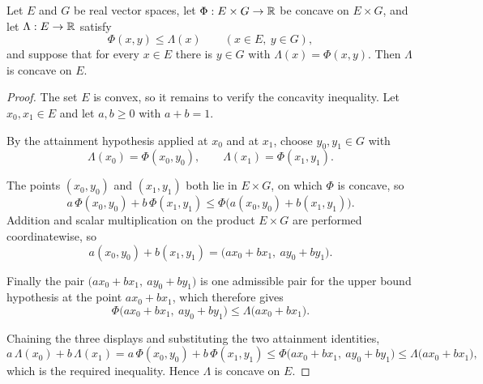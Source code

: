 \begin{lemma}
Let $E$ and $G$ be real vector spaces, let $\Phi:E\times G\to\mathbb{R}$ be concave on
$E\times G$, and let $\Lambda:E\to\mathbb{R}$ satisfy
\[
  \Phi(x,y)\le\Lambda(x)\qquad(x\in E,\ y\in G),
\]
and suppose that for every $x\in E$ there is $y\in G$ with $\Lambda(x)=\Phi(x,y)$. Then
$\Lambda$ is concave on $E$.
\end{lemma}
\begin{proof}
The set $E$ is convex, so it remains to verify the concavity inequality. Let $x_0,x_1\in E$
and let $a,b\ge0$ with $a+b=1$.

By the attainment hypothesis applied at $x_0$ and at $x_1$, choose $y_0,y_1\in G$ with
\[
  \Lambda(x_0)=\Phi(x_0,y_0),\qquad \Lambda(x_1)=\Phi(x_1,y_1).
\]

The points $(x_0,y_0)$ and $(x_1,y_1)$ both lie in $E\times G$, on which $\Phi$ is
concave, so
\[
  a\,\Phi(x_0,y_0)+b\,\Phi(x_1,y_1)
   \le\Phi\bigl(a(x_0,y_0)+b(x_1,y_1)\bigr).
\]
Addition and scalar multiplication on the product $E\times G$ are performed
coordinatewise, so
\[
  a(x_0,y_0)+b(x_1,y_1)=\bigl(ax_0+bx_1,\ ay_0+by_1\bigr).
\]

Finally the pair $\bigl(ax_0+bx_1,\ ay_0+by_1\bigr)$ is one admissible pair for the upper
bound hypothesis at the point $ax_0+bx_1$, which therefore gives
\[
  \Phi\bigl(ax_0+bx_1,\ ay_0+by_1\bigr)\le\Lambda\bigl(ax_0+bx_1\bigr).
\]

Chaining the three displays and substituting the two attainment identities,
\[
  a\,\Lambda(x_0)+b\,\Lambda(x_1)
   =a\,\Phi(x_0,y_0)+b\,\Phi(x_1,y_1)
   \le\Phi\bigl(ax_0+bx_1,\ ay_0+by_1\bigr)
   \le\Lambda\bigl(ax_0+bx_1\bigr),
\]
which is the required inequality. Hence $\Lambda$ is concave on $E$.
\end{proof}
